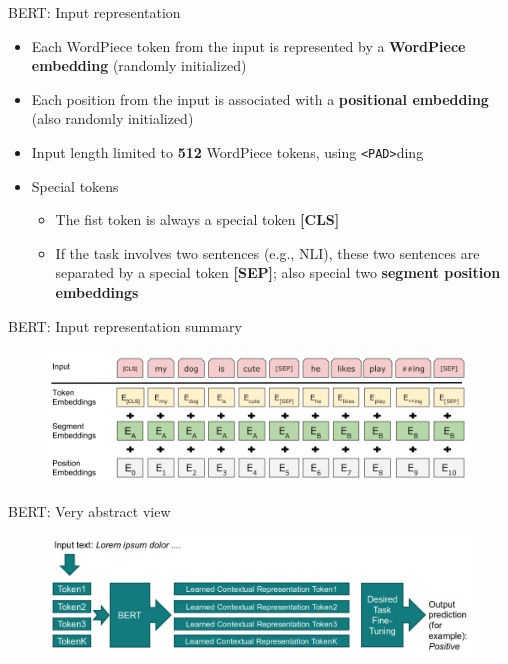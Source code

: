 \documentclass[12pt]{beamer}
\begin{document}
\begin{frame}{BERT: Input representation}
	
\begin{itemize}
	\item Each WordPiece token from the input is represented by a \textbf{WordPiece embedding} (randomly initialized)
	\item Each position from the input is associated with a \textbf{positional embedding} (also randomly initialized)
	\item Input length limited to \textbf{512} WordPiece tokens, using \texttt{<PAD>}ding
	\item Special tokens
	\begin{itemize}
		\item The fist token is always a special token \textbf{[CLS]}
		\item If the task involves two sentences (e.g., NLI), these two sentences are separated by a special token \textbf{[SEP]}; also special two \textbf{segment position embeddings} 
	\end{itemize}

\end{itemize}
	
\end{frame}


\begin{frame}{BERT: Input representation summary}
	
\begin{figure}
\includegraphics[width=\linewidth]{img/bert-input.png}	
\end{figure}
	
\end{frame}

\begin{frame}{BERT: Very abstract view}
	
	\begin{figure}
		\includegraphics[width=\linewidth]{img/bert1.png}
	\end{figure}	
	
\end{frame}
\end{document}
